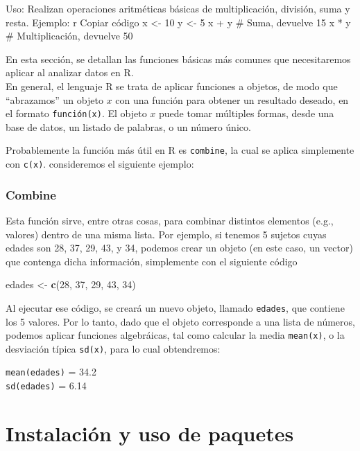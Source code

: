 \documentclass[
]{book}
\newenvironment{Shaded}{\begin{snugshade}}{\end{snugshade}}
\newcommand{\DecValTok}[1]{\textcolor[rgb]{0.00,0.00,0.81}{#1}}
\newcommand{\FunctionTok}[1]{\textcolor[rgb]{0.13,0.29,0.53}{\textbf{#1}}}
\newcommand{\NormalTok}[1]{#1}
\newcommand{\OtherTok}[1]{\textcolor[rgb]{0.56,0.35,0.01}{#1}}
\begin{document}
Uso: Realizan operaciones aritméticas básicas de multiplicación, división, suma y resta.
Ejemplo:
r
Copiar código
x \textless- 10
y \textless- 5
x + y \# Suma, devuelve 15
x * y \# Multiplicación, devuelve 50

En esta sección, se detallan las funciones básicas más comunes que necesitaremos aplicar al analizar datos en R.\\
En general, el lenguaje R se trata de aplicar funciones a objetos, de modo que ``abrazamos'' un objeto \(x\) con una función para obtener un resultado deseado, en el formato \texttt{función(x)}. El objeto \(x\) puede tomar múltiples formas, desde una base de datos, un listado de palabras, o un número único.

Probablemente la función más útil en R es \texttt{combine}, la cual se aplica simplemente con \texttt{c(x)}. consideremos el siguiente ejemplo:

\subsection{Combine}\label{combine}

Esta función sirve, entre otras cosas, para combinar distintos elementos (e.g., valores) dentro de una misma lista. Por ejemplo, si tenemos 5 sujetos cuyas edades son 28, 37, 29, 43, y 34, podemos crear un objeto (en este caso, un vector) que contenga dicha información, simplemente con el siguiente código

\begin{Shaded}
\begin{Highlighting}[]
\NormalTok{edades }\OtherTok{\textless{}{-}} \FunctionTok{c}\NormalTok{(}\DecValTok{28}\NormalTok{, }\DecValTok{37}\NormalTok{, }\DecValTok{29}\NormalTok{, }\DecValTok{43}\NormalTok{, }\DecValTok{34}\NormalTok{)}
\end{Highlighting}
\end{Shaded}

Al ejecutar ese código, se creará un nuevo objeto, llamado \texttt{edades}, que contiene los 5 valores. Por lo tanto, dado que el objeto corresponde a una lista de números, podemos aplicar funciones algebráicas, tal como calcular la media \texttt{mean(x)}, o la desviación típica \texttt{sd(x)}, para lo cual obtendremos:

\texttt{mean(edades)} = 34.2\\
\texttt{sd(edades)} = 6.14

\chapter{Instalación y uso de paquetes}\label{paquetes}
\end{document}
